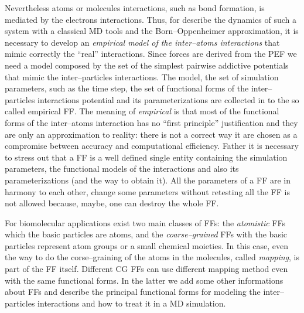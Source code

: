 Nevertheless atoms or molecules interactions, such as bond formation, is mediated by the electrons interactions. Thus, for describe the dynamics of such a system with a classical \ac{MD} tools and the Born--Oppenheimer approximation, it is necessary to develop an \textit{empirical model of the inter--atoms interactions} that mimic correctly the ``real'' interactions. Since forces are derived from the \ac{PEF} we need a model composed by the set of the simplest pairwise addictive potentials that mimic the inter--particles interactions. The model, the set of simulation parameters, such as the time step, the set of functional forms of the inter--particles interactions potential and its parameterizations are collected in to the so called empirical \acf{FF}. The meaning of \textit{empirical} is that most of the functional forms of the inter--atoms interaction has no ``first principle'' justification and they are only an approximation to reality: there is not a correct way it are chosen as a compromise between accuracy and computational efficiency. Father it is necessary to stress out that a \ac{FF} is a well defined single entity containing the simulation parameters, the functional models of the interactions and also its parameterizations (and the way to obtain it). All the parameters of a \ac{FF} are in harmony to each other, change some parameters without retesting all the \ac{FF} is not allowed because, maybe, one can destroy the whole \ac{FF}.

For biomolecular applications exist two main classes of \acp{FF}: the \textit{atomistic} \acp{FF} which the basic particles are atoms, and the \textit{coarse--grained} \acp{FF} with the basic particles represent atom groups or a small chemical moieties. In this case, even the way to do the corse--graining of the atoms in the molecules, called \textit{mapping}, is part of the \ac{FF} itself. Different \ac{CG} \acp{FF} can use different mapping method even with the same functional forms. In the latter we add some other informations about \acp{FF} and describe the principal functional forms for modeling the inter--particles interactions and how to treat it in a \ac{MD} simulation.

